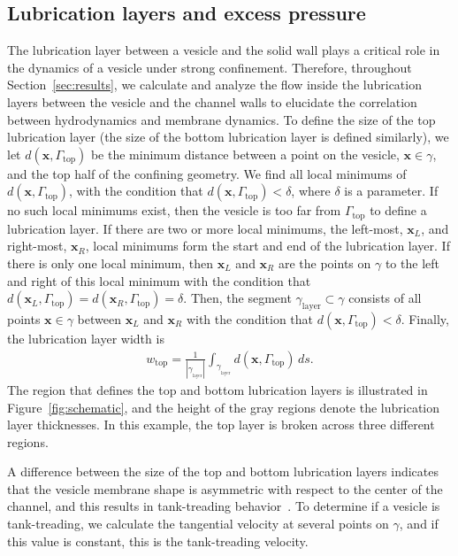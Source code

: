 \documentclass[twoside,twocolumn,9pt]{article}
\newcommand{\xx}{\mathbf{x}}
\begin{document}
\subsection{\label{sec:LL} Lubrication layers and excess pressure}
The lubrication layer between a vesicle and the solid wall plays a
critical role in the dynamics of a vesicle under strong confinement.
Therefore, throughout Section~\ref{sec:results}, we calculate and
analyze the flow inside the lubrication layers between the vesicle and
the channel walls to elucidate the correlation between hydrodynamics and
membrane dynamics. To define the size of the top lubrication layer (the
size of the bottom lubrication layer is defined similarly), we let
$d(\xx,\Gamma_\mathrm{top})$ be the minimum distance between a point on
the vesicle, $\xx \in \gamma$, and the top half of the confining
geometry. We find all local minimums of $d(\xx,\Gamma_\mathrm{top})$,
with the condition that $d(\xx,\Gamma_\mathrm{top}) < \delta$, where
$\delta$ is a parameter. If no such local minimums exist, then the
vesicle is too far from $\Gamma_\mathrm{top}$ to define a lubrication
layer. If there are two or more local minimums, the left-most, $\xx_L$,
and right-most, $\xx_R$, local minimums form the start and end of the
lubrication layer.  If there is only one local minimum, then $\xx_L$ and
$\xx_R$ are the points on $\gamma$ to the left and right of this local
minimum with the condition that $d(\xx_L,\Gamma_\mathrm{top}) =
d(\xx_R,\Gamma_\mathrm{top}) = \delta$. Then, the segment
$\gamma_{\mathrm{layer}} \subset \gamma$ consists of all points $\xx \in
\gamma$ between $\xx_L$ and $\xx_R$ with the condition that
$d(\xx,\Gamma_\mathrm{top}) < \delta$. Finally, the lubrication layer
width is
\begin{align}
  w_\mathrm{top} = \frac{1}{|\gamma_{_\mathrm{layer}}|} 
    \int_{\gamma_{_\mathrm{layer}}} d(\xx,\Gamma_\mathrm{top}) \, ds.
\end{align}
The region that defines the top and bottom lubrication layers is
illustrated in Figure~\ref{fig:schematic}, and the height of the gray
regions denote the lubrication layer thicknesses. In this example, the
top layer is broken across three different regions.

A difference between the size of the top and bottom lubrication layers
indicates that the vesicle membrane shape is asymmetric with respect to
the center of the channel, and this results in tank-treading
behavior~\cite{aga-bir2020}. To determine if a vesicle is tank-treading,
we calculate the tangential velocity at several points on $\gamma$, and
if this value is constant, this is the tank-treading velocity.
\end{document}
